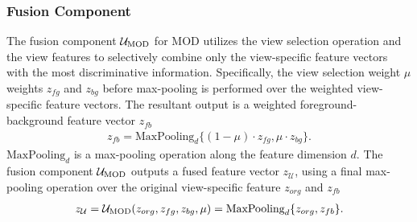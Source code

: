 \subsubsection{Fusion Component}
The fusion component $\mathcal{U}_{\text{MOD}}$ for MOD utilizes the view selection operation and the view features to selectively combine only the view-specific feature vectors with the most discriminative information. Specifically, the view selection weight $\mu$ weights $z_{fg}$ and $z_{bg}$ before max-pooling is performed over the weighted view-specific feature vectors. The resultant output is a weighted foreground-background feature vector $z_{fb}$
\begin{equation}
\begin{aligned}
    z_{fb} = \text{MaxPooling}_{d} \{(1-\mu) \cdot z_{fg}, \mu \cdot z_{bg}\}.
\end{aligned}
\end{equation}
$\text{MaxPooling}_{d}$ is a max-pooling operation along the feature dimension $d$. The fusion component $\mathcal{U}_{\text{MOD}}$ outputs a fused feature vector $z_{\mathcal{U}}$, using a final max-pooling operation over the original view-specific feature $z_{org}$ and $z_{fb}$
\begin{equation}
\begin{aligned}
    z_{\mathcal{U}} = \mathcal{U}_{\text{MOD}}(z_{org}, z_{fg}, z_{bg}, \mu) = \text{MaxPooling}_{d} \{z_{org}, z_{fb}\}.
\end{aligned}
\end{equation}

